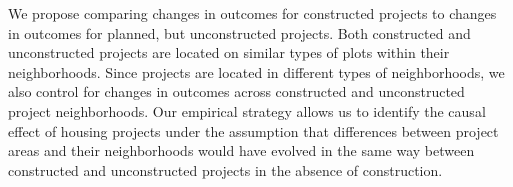\documentclass[12pt]{article}
\begin{document}
We propose comparing changes in outcomes for constructed projects to changes in outcomes for planned, but unconstructed projects.  Both constructed and unconstructed projects are located on similar types of plots within their neighborhoods.  Since projects are located in different types of neighborhoods, we also control for changes in outcomes across constructed and unconstructed project neighborhoods.  Our empirical strategy allows us to identify the causal effect of housing projects under the assumption that differences between project areas and their neighborhoods would have evolved in the same way between constructed and unconstructed projects in the absence of construction.










\end{document}
